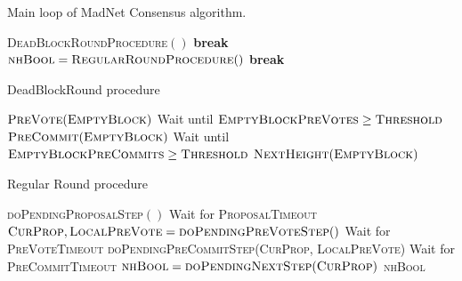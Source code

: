 \begin{algorithm}[p]
\caption{Main loop of MadNet Consensus algorithm.}
\label{alg:madnet_consensus}
\begin{algorithmic}[1]
            \State \textsc{DeadBlockRoundProcedure}$()$
            \State \textbf{break}
        \EndIf
        \State $\textsc{nhBool} = \textsc{RegularRoundProcedure}()$
            \State \textbf{break}
        \EndIf
    \EndFor
    \State \Return
\EndFunction
\end{algorithmic}
\end{algorithm}

\begin{algorithm}[p]
\caption{DeadBlockRound procedure}
\label{alg:dbr_proc}
\begin{algorithmic}[1]
    \State $\textsc{PreVote}(\textsc{EmptyBlock})$
    \State Wait until $\textsc{EmptyBlockPreVotes}\ge\textsc{Threshold}$
    \State $\textsc{PreCommit}(\textsc{EmptyBlock})$
    \State Wait until $\textsc{EmptyBlockPreCommits}\ge\textsc{Threshold}$
    \State $\textsc{NextHeight}(\textsc{EmptyBlock})$
    \State \Return
\EndFunction
\end{algorithmic}
\end{algorithm}

\begin{algorithm}[p]
\caption{Regular Round procedure}
\label{alg:rr_proc}
\begin{algorithmic}[1]
    \State \textsc{doPendingProposalStep}$()$
    \State Wait for \textsc{ProposalTimeout}
    \State $\textsc{CurProp}, \textsc{LocalPreVote}
        = \textsc{doPendingPreVoteStep}()$
    \State Wait for \textsc{PreVoteTimeout}
    \State \textsc{doPendingPreCommitStep}(\textsc{CurProp},
        \textsc{LocalPreVote})
    \State Wait for \textsc{PreCommitTimeout}
    \State $\textsc{nhBool} = \textsc{doPendingNextStep}(\textsc{CurProp})$
    \State \Return \textsc{nhBool}
\EndFunction
\end{algorithmic}
\end{algorithm}

